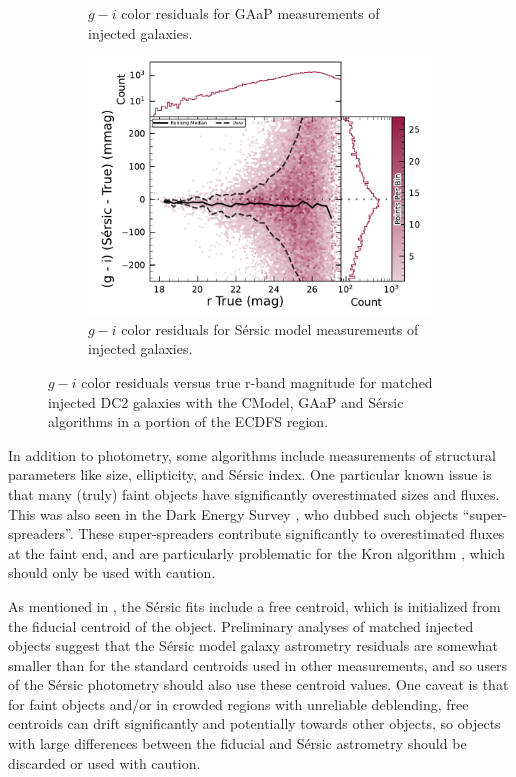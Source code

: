\begin{figure}[hbt!]
\begin{subfigure}[t]{0.31\textwidth}
  \caption{$g-i$ color residuals for \gls{GAaP} measurements of injected galaxies.}
  \end{subfigure}\hfill
    \begin{subfigure}[t]{0.31\textwidth}
\includegraphics[width=\linewidth]{injected_lsst_cells_v1_5063_r_color_sersic_g_minus_i}
  \caption{$g-i$ color residuals for S\'ersic model measurements of injected galaxies.}
  \end{subfigure}\hfill
\caption{$g-i$ color residuals versus true r-band magnitude for matched injected DC2 galaxies with the CModel, \gls{GAaP} and S\'ersic algorithms in a portion of the \gls{ECDFS} region.}
\label{fig:injected_lsst_cells_v1_5063_r_color_g_minus_i}
\end{figure}
In addition to photometry, some algorithms include measurements of structural parameters like size, ellipticity, and S\'ersic index.
One particular known issue is that many (truly) faint objects have significantly overestimated sizes and fluxes.
This was also seen in the Dark Energy Survey \citep{2025arXiv250105739B}, who dubbed such objects ``super-spreaders''.
These super-spreaders contribute significantly to overestimated fluxes at the faint end, and are particularly problematic for the Kron algorithm \citep{1980ApJS...43..305K}, which should only be used with caution.

As mentioned in , the S\'ersic fits include a free centroid, which is initialized from the fiducial centroid of the object.
Preliminary analyses of matched injected objects suggest that the S\'ersic model galaxy \gls{astrometry} residuals are somewhat smaller than for the standard centroids used in other measurements, and so users of the S\'ersic photometry should also use these centroid values.
One caveat is that for faint objects and/or in crowded regions with unreliable deblending, free centroids can drift significantly and potentially towards other objects, so objects with large differences between the fiducial and S\'ersic \gls{astrometry} should be discarded or used with caution.

